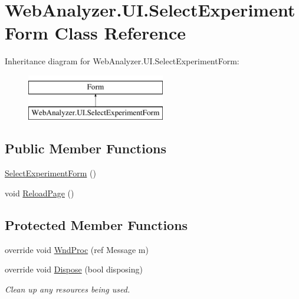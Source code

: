 \hypertarget{class_web_analyzer_1_1_u_i_1_1_select_experiment_form}{}\section{Web\+Analyzer.\+U\+I.\+Select\+Experiment\+Form Class Reference}
\label{class_web_analyzer_1_1_u_i_1_1_select_experiment_form}
Inheritance diagram for Web\+Analyzer.\+U\+I.\+Select\+Experiment\+Form\+:\begin{figure}[H]
\begin{center}
\leavevmode
\includegraphics[height=2.000000cm]{class_web_analyzer_1_1_u_i_1_1_select_experiment_form}
\end{center}
\end{figure}
\subsection*{Public Member Functions}
\begin{DoxyCompactItemize}
\item 
\hyperlink{class_web_analyzer_1_1_u_i_1_1_select_experiment_form_a02acf3f785b0673b34e7a6115d1f8b63}{Select\+Experiment\+Form} ()
\item 
void \hyperlink{class_web_analyzer_1_1_u_i_1_1_select_experiment_form_ad75e630924f451b00c681eead2a2412d}{Reload\+Page} ()
\end{DoxyCompactItemize}
\subsection*{Protected Member Functions}
\begin{DoxyCompactItemize}
\item 
override void \hyperlink{class_web_analyzer_1_1_u_i_1_1_select_experiment_form_a84a3493bde370f13c6e2dc039da3d120}{Wnd\+Proc} (ref Message m)
\item 
override void \hyperlink{class_web_analyzer_1_1_u_i_1_1_select_experiment_form_abb5373fcb6854347261f268740f0415c}{Dispose} (bool disposing)
\begin{DoxyCompactList}\small\item\em Clean up any resources being used. \end{DoxyCompactList}\end{DoxyCompactItemize}
